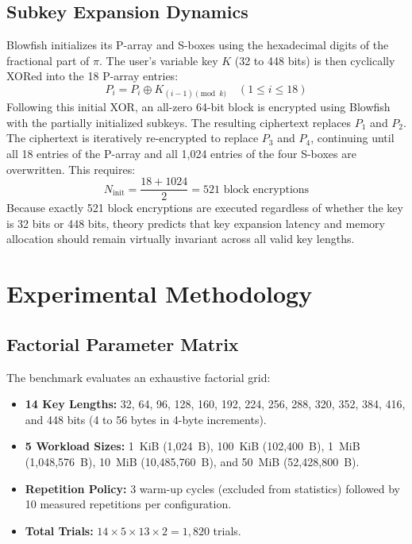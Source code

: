 \documentclass[conference]{IEEEtran}
\begin{document}
\subsection{Subkey Expansion Dynamics}
Blowfish initializes its P-array and S-boxes using the hexadecimal digits of the fractional part of $\pi$. The user's variable key $K$ (32 to 448 bits) is then cyclically XORed into the 18 P-array entries:
\begin{equation}
P_i = P_i \oplus K_{(i-1) \pmod{k}} \quad (1 \le i \le 18)
\end{equation}
Following this initial XOR, an all-zero 64-bit block is encrypted using Blowfish with the partially initialized subkeys. The resulting ciphertext replaces $P_1$ and $P_2$. The ciphertext is iteratively re-encrypted to replace $P_3$ and $P_4$, continuing until all 18 entries of the P-array and all 1,024 entries of the four S-boxes are overwritten. This requires:
\begin{equation}
N_{\text{init}} = \frac{18 + 1024}{2} = 521 \text{ block encryptions}
\end{equation}
Because exactly 521 block encryptions are executed regardless of whether the key is 32 bits or 448 bits, theory predicts that key expansion latency and memory allocation should remain virtually invariant across all valid key lengths.

\section{Experimental Methodology}

\subsection{Factorial Parameter Matrix}
The benchmark evaluates an exhaustive factorial grid:
\begin{itemize}
    \item \textbf{14 Key Lengths:} 32, 64, 96, 128, 160, 192, 224, 256, 288, 320, 352, 384, 416, and 448 bits (4 to 56 bytes in 4-byte increments).
    \item \textbf{5 Workload Sizes:} 1~KiB (1,024~B), 100~KiB (102,400~B), 1~MiB (1,048,576~B), 10~MiB (10,485,760~B), and 50~MiB (52,428,800~B).
    \item \textbf{Repetition Policy:} 3 warm-up cycles (excluded from statistics) followed by 10 measured repetitions per configuration.
    \item \textbf{Total Trials:} $14 \times 5 \times 13 \times 2 = 1,820$ trials.
\end{itemize}
\end{document}
